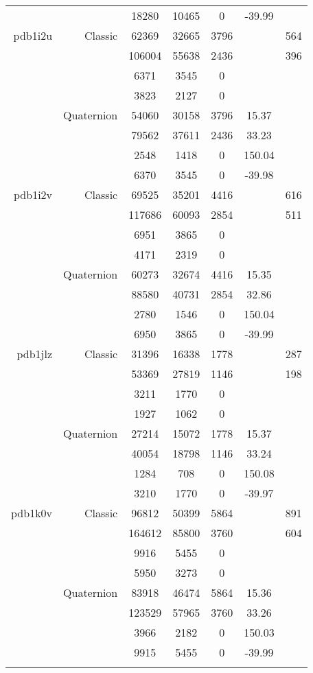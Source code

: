 \begin{xltabular}{\textwidth}{r|rcccSc}
& & 18280 & 10465 & 0 & -39.99 & \\ \addlinespace
pdb1i2u & Classic & 62369 & 32665 & 3796 & & 564 \\
& & 106004 & 55638 & 2436 & & 396 \\
& & 6371 & 3545 & 0 & & \\
& & 3823 & 2127 & 0 & & \\
& Quaternion & 54060 & 30158 & 3796 & 15.37 & \\
& & 79562 & 37611 & 2436 & 33.23 & \\
& & 2548 & 1418 & 0 & 150.04 & \\
& & 6370 & 3545 & 0 & -39.98 & \\ \addlinespace
pdb1i2v & Classic & 69525 & 35201 & 4416 & & 616 \\
& & 117686 & 60093 & 2854 & & 511 \\
& & 6951 & 3865 & 0 & & \\
& & 4171 & 2319 & 0 & & \\
& Quaternion & 60273 & 32674 & 4416 & 15.35 & \\
& & 88580 & 40731 & 2854 & 32.86 & \\
& & 2780 & 1546 & 0 & 150.04 & \\
& & 6950 & 3865 & 0 & -39.99 & \\ \addlinespace
pdb1jlz & Classic & 31396 & 16338 & 1778 & & 287 \\
& & 53369 & 27819 & 1146 & & 198 \\
& & 3211 & 1770 & 0 & & \\
& & 1927 & 1062 & 0 & & \\
& Quaternion & 27214 & 15072 & 1778 & 15.37 & \\
& & 40054 & 18798 & 1146 & 33.24 & \\
& & 1284 & 708 & 0 & 150.08 & \\
& & 3210 & 1770 & 0 & -39.97 & \\ \addlinespace
pdb1k0v & Classic & 96812 & 50399 & 5864 & & 891 \\
& & 164612 & 85800 & 3760 & & 604 \\
& & 9916 & 5455 & 0 & & \\
& & 5950 & 3273 & 0 & & \\
& Quaternion & 83918 & 46474 & 5864 & 15.36 & \\
& & 123529 & 57965 & 3760 & 33.26 & \\
& & 3966 & 2182 & 0 & 150.03 & \\
& & 9915 & 5455 & 0 & -39.99 & \\ \addlinespace

\end{xltabular}
